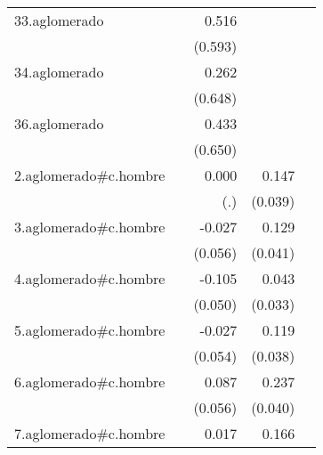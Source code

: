 {\begin{longtable}{l*{4}{D{.}{.}{-1}}}
\addlinespace
33.aglomerado&                     &       0.516         &                     &                     \\
            &                     &     (0.593)         &                     &                     \\
\addlinespace
34.aglomerado&                     &       0.262         &                     &                     \\
            &                     &     (0.648)         &                     &                     \\
\addlinespace
36.aglomerado&                     &       0.433         &                     &                     \\
            &                     &     (0.650)         &                     &                     \\
\addlinespace
2.aglomerado#c.hombre&                     &       0.000         &       0.147\sym{***}&                     \\
            &                     &         (.)         &     (0.039)         &                     \\
\addlinespace
3.aglomerado#c.hombre&                     &      -0.027         &       0.129\sym{**} &                     \\
            &                     &     (0.056)         &     (0.041)         &                     \\
\addlinespace
4.aglomerado#c.hombre&                     &      -0.105\sym{*}  &       0.043         &                     \\
            &                     &     (0.050)         &     (0.033)         &                     \\
\addlinespace
5.aglomerado#c.hombre&                     &      -0.027         &       0.119\sym{**} &                     \\
            &                     &     (0.054)         &     (0.038)         &                     \\
\addlinespace
6.aglomerado#c.hombre&                     &       0.087         &       0.237\sym{***}&                     \\
            &                     &     (0.056)         &     (0.040)         &                     \\
\addlinespace
7.aglomerado#c.hombre&                     &       0.017         &       0.166\sym{***}&                     \\

\end{longtable}}

